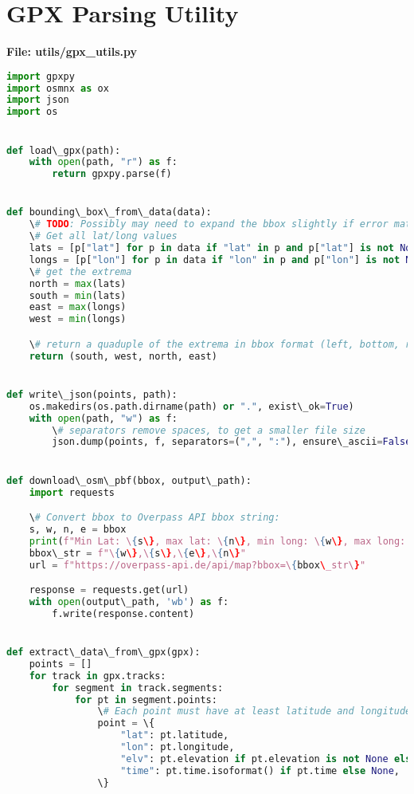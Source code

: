 \documentclass[11pt]{article}
\begin{document}
\section{GPX Parsing Utility}
\textbf{File: utils/gpx\_utils.py}
\begin{lstlisting}[language=Python]
import gpxpy
import osmnx as ox
import json
import os


def load\_gpx(path):
    with open(path, "r") as f:
        return gpxpy.parse(f)


def bounding\_box\_from\_data(data):
    \# TODO: Possibly may need to expand the bbox slightly if error matching causes issues, route could go outside the box even if gpx points don't
    \# Get all lat/long values
    lats = [p["lat"] for p in data if "lat" in p and p["lat"] is not None]
    longs = [p["lon"] for p in data if "lon" in p and p["lon"] is not None]
    \# get the extrema
    north = max(lats)
    south = min(lats)
    east = max(longs)
    west = min(longs)

    \# return a quaduple of the extrema in bbox format (left, bottom, right, top)
    return (south, west, north, east)


def write\_json(points, path):
    os.makedirs(os.path.dirname(path) or ".", exist\_ok=True)
    with open(path, "w") as f:
        \# separators remove spaces, to get a smaller file size
        json.dump(points, f, separators=(",", ":"), ensure\_ascii=False)


def download\_osm\_pbf(bbox, output\_path):
    import requests

    \# Convert bbox to Overpass API bbox string:
    s, w, n, e = bbox
    print(f"Min Lat: \{s\}, max lat: \{n\}, min long: \{w\}, max long: \{e\}")
    bbox\_str = f"\{w\},\{s\},\{e\},\{n\}"
    url = f"https://overpass-api.de/api/map?bbox=\{bbox\_str\}"

    response = requests.get(url)
    with open(output\_path, 'wb') as f:
        f.write(response.content)


def extract\_data\_from\_gpx(gpx):
    points = []
    for track in gpx.tracks:
        for segment in track.segments:
            for pt in segment.points:
                \# Each point must have at least latitude and longitude
                point = \{
                    "lat": pt.latitude,
                    "lon": pt.longitude,
                    "elv": pt.elevation if pt.elevation is not None else None,
                    "time": pt.time.isoformat() if pt.time else None,
                \}


\end{lstlisting}
\end{document}
